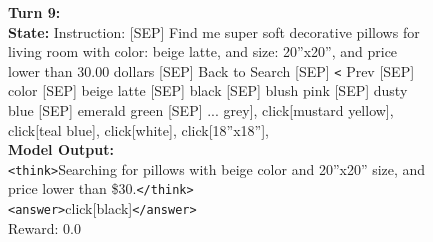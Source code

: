 \begin{figure}[t]
\begin{tcolorbox}[colback=gray!2, colframe=black, boxrule=0.5pt, arc=2pt, width=0.95\linewidth, title=0.5B WebShop – Multi-Turn Rollout]
\textbf{Turn 9:} \\
\textbf{State:}
Instruction: [SEP] Find me super soft decorative pillows for living room with color: beige latte, and size: 20''x20'', and price lower than 30.00 dollars [SEP] Back to Search [SEP] \texttt{<} Prev [SEP] color [SEP] beige latte [SEP] black [SEP] blush pink [SEP] dusty blue [SEP] emerald green [SEP] ... grey], click[mustard yellow], click[teal blue], click[white], click[18''x18''],\\
\textbf{Model Output:} \\
\texttt{<think>}Searching for pillows with beige color and 20''x20'' size, and price lower than \$30.\texttt{</think>} \\
\texttt{<answer>}click[black]\texttt{</answer>} \\
Reward: 0.0


\end{tcolorbox}
\end{figure}


